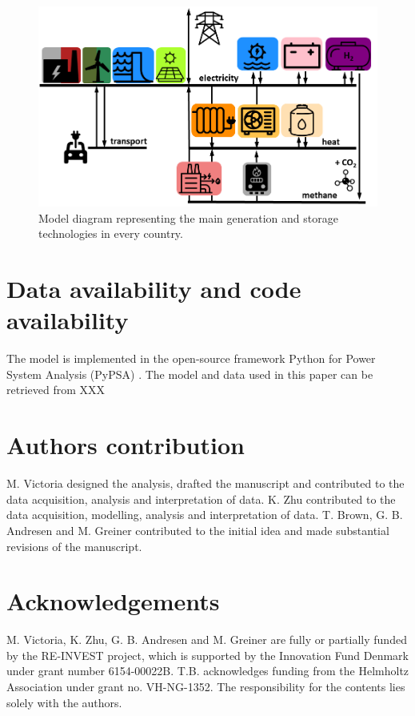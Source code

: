 \documentclass[5p]{elsarticle} %
\begin{document}
\begin{figure}[!h]
\centering
\includegraphics[width=\columnwidth]{figures/model.png}
\caption{Model diagram representing the main generation and storage technologies in every country.} \label{fig_model} 
\end{figure}

\section{Data availability and code availability}

The model is implemented in the open-source framework Python for Power System Analysis (PyPSA) \cite{PyPSA}. The model and data used in this paper can be retrieved from \textcolor[rgb]{1,0,0}{XXX}

\section{Authors contribution}

M. Victoria designed the analysis, drafted the manuscript and contributed to the data acquisition, analysis and interpretation of data. K. Zhu contributed to the data acquisition, modelling, analysis and interpretation of data. 
T. Brown, G. B. Andresen and M. Greiner contributed to the initial idea and made substantial revisions of the manuscript. 

\section{Acknowledgements}
M. Victoria, K. Zhu, G. B. Andresen and M. Greiner are fully or partially funded by the RE-INVEST project, which is supported by  the  Innovation  Fund  Denmark  under  grant  number  6154-00022B. T.B. acknowledges funding from the Helmholtz Association under grant no. VH-NG-1352. The responsibility for the contents lies solely with the authors.


\end{document}
